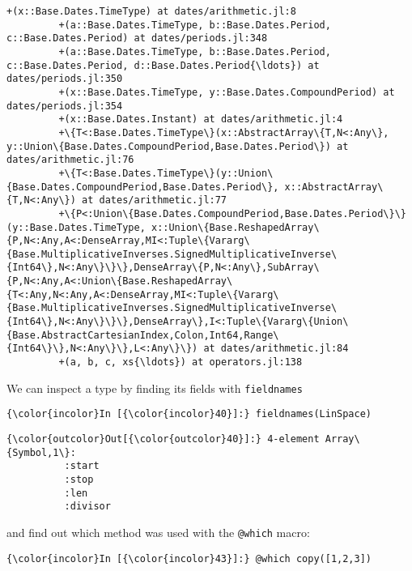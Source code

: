 \documentclass[11pt]{article}
\begin{document}
\begin{Verbatim}[commandchars=\\\{\}]
         +(x::Base.Dates.TimeType) at dates/arithmetic.jl:8
         +(a::Base.Dates.TimeType, b::Base.Dates.Period, c::Base.Dates.Period) at dates/periods.jl:348
         +(a::Base.Dates.TimeType, b::Base.Dates.Period, c::Base.Dates.Period, d::Base.Dates.Period{\ldots}) at dates/periods.jl:350
         +(x::Base.Dates.TimeType, y::Base.Dates.CompoundPeriod) at dates/periods.jl:354
         +(x::Base.Dates.Instant) at dates/arithmetic.jl:4
         +\{T<:Base.Dates.TimeType\}(x::AbstractArray\{T,N<:Any\}, y::Union\{Base.Dates.CompoundPeriod,Base.Dates.Period\}) at dates/arithmetic.jl:76
         +\{T<:Base.Dates.TimeType\}(y::Union\{Base.Dates.CompoundPeriod,Base.Dates.Period\}, x::AbstractArray\{T,N<:Any\}) at dates/arithmetic.jl:77
         +\{P<:Union\{Base.Dates.CompoundPeriod,Base.Dates.Period\}\}(y::Base.Dates.TimeType, x::Union\{Base.ReshapedArray\{P,N<:Any,A<:DenseArray,MI<:Tuple\{Vararg\{Base.MultiplicativeInverses.SignedMultiplicativeInverse\{Int64\},N<:Any\}\}\},DenseArray\{P,N<:Any\},SubArray\{P,N<:Any,A<:Union\{Base.ReshapedArray\{T<:Any,N<:Any,A<:DenseArray,MI<:Tuple\{Vararg\{Base.MultiplicativeInverses.SignedMultiplicativeInverse\{Int64\},N<:Any\}\}\},DenseArray\},I<:Tuple\{Vararg\{Union\{Base.AbstractCartesianIndex,Colon,Int64,Range\{Int64\}\},N<:Any\}\},L<:Any\}\}) at dates/arithmetic.jl:84
         +(a, b, c, xs{\ldots}) at operators.jl:138
\end{Verbatim}
        
    We can inspect a type by finding its fields with \texttt{fieldnames}

    \begin{Verbatim}[commandchars=\\\{\}]
{\color{incolor}In [{\color{incolor}40}]:} fieldnames(LinSpace)
\end{Verbatim}

            \begin{Verbatim}[commandchars=\\\{\}]
{\color{outcolor}Out[{\color{outcolor}40}]:} 4-element Array\{Symbol,1\}:
          :start  
          :stop   
          :len    
          :divisor
\end{Verbatim}
        
    and find out which method was used with the \texttt{@which} macro:

    \begin{Verbatim}[commandchars=\\\{\}]
{\color{incolor}In [{\color{incolor}43}]:} @which copy([1,2,3])
\end{Verbatim}
\end{document}
